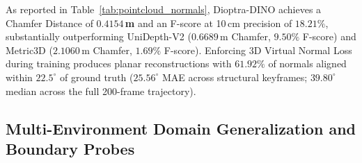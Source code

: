 \begin{table}[h]
\centering
\caption{\textbf{3D Surface Normal and Point Cloud Reconstruction Accuracy Across Structural Keyframes}. Evaluated across representative trajectory keyframes on \textit{abandonedfactory/P010} ($25.56^\circ$ MAE for Dioptra-DINO on structured corridor geometry; across the unbroken 200-frame trajectory containing irregular debris, the trajectory-wide median normal error is $39.80^\circ$, as detailed in Section~\ref{sec:discussion}). Surface Normal Mean Angular Error (MAE in degrees), angular accuracies ($<11.25^\circ, <22.5^\circ, <30.0^\circ$), 3D Chamfer Distance (metres), and 3D F-Score at $10$\,cm precision threshold.}
\label{tab:pointcloud_normals}
\vspace{0.2em}
\end{table}

As reported in Table~\ref{tab:pointcloud_normals}, Dioptra-DINO achieves a Chamfer Distance of \textbf{$0.4154$\,m} and an F-score at 10\,cm precision of \textbf{$18.21\%$}, substantially outperforming UniDepth-V2 ($0.6689$\,m Chamfer, $9.50\%$ F-score) and Metric3D ($2.1060$\,m Chamfer, $1.69\%$ F-score). Enforcing 3D Virtual Normal Loss during training produces planar reconstructions with $61.92\%$ of normals aligned within $22.5^\circ$ of ground truth ($25.56^\circ$ MAE across structural keyframes; $39.80^\circ$ median across the full 200-frame trajectory).


\subsection{Multi-Environment Domain Generalization and Boundary Probes}
\label{sec:multienv_generalization}

